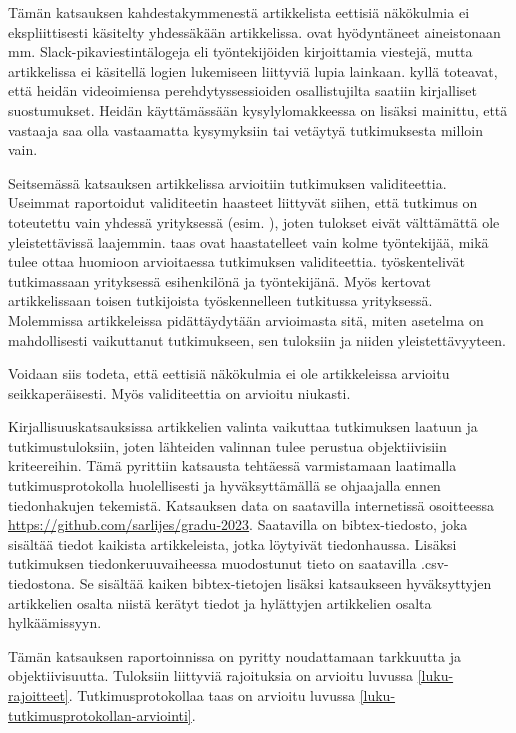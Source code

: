 \documentclass[utf8]{gradu3}
\begin{document}
Tämän katsauksen kahdestakymmenestä artikkelista eettisiä näkökulmia ei ekspliittisesti käsitelty yhdessäkään artikkelissa. \textcite{moe-ym-2020} ovat hyödyntäneet aineistonaan mm. Slack-pikaviestintälogeja eli työntekijöiden kirjoittamia viestejä, mutta artikkelissa ei käsitellä logien lukemiseen liittyviä lupia lainkaan. \textcite{yates-ym-2020} kyllä toteavat, että heidän videoimiensa perehdytyssessioiden osallistujilta saatiin kirjalliset suostumukset. Heidän käyttämässään kysylylomakkeessa on lisäksi mainittu, että vastaaja saa olla vastaamatta kysymyksiin tai vetäytyä tutkimuksesta milloin vain. 

Seitsemässä katsauksen artikkelissa arvioitiin tutkimuksen validiteettia. Useimmat raportoidut validiteetin haasteet liittyvät siihen, että tutkimus on toteutettu vain yhdessä yrityksessä (esim. \textcite{johnson-senges-2010}), joten tulokset eivät välttämättä ole yleistettävissä laajemmin. \textcite{viana-ym-2014} taas ovat haastatelleet vain kolme työntekijää, mikä tulee ottaa huomioon arvioitaessa tutkimuksen validiteettia. \textcite{hemphill-begel-2011} työskentelivät tutkimassaan yrityksessä esihenkilönä ja työntekijänä. Myös \textcite{kumar-wallace-2019} kertovat artikkelissaan toisen tutkijoista työskennelleen tutkitussa yrityksessä. Molemmissa artikkeleissa pidättäydytään arvioimasta sitä, miten asetelma on mahdollisesti vaikuttanut tutkimukseen, sen tuloksiin ja niiden yleistettävyyteen.

Voidaan siis todeta, että eettisiä näkökulmia ei ole artikkeleissa arvioitu seikkaperäisesti. Myös validiteettia on arvioitu niukasti.

Kirjallisuuskatsauksissa artikkelien valinta vaikuttaa tutkimuksen laatuun ja tutkimustuloksiin, joten lähteiden valinnan tulee perustua objektiivisiin kriteereihin. Tämä pyrittiin katsausta tehtäessä varmistamaan laatimalla tutkimusprotokolla huolellisesti ja hyväksyttämällä se ohjaajalla ennen tiedonhakujen tekemistä. Katsauksen data on saatavilla internetissä osoitteessa 
 \href{https://github.com/sarlijes/gradu-2023}{https://github.com/sarlijes/gradu-2023}. Saatavilla on bibtex-tiedosto, joka sisältää tiedot kaikista artikkeleista, jotka löytyivät tiedonhaussa. Lisäksi tutkimuksen tiedonkeruuvaiheessa muodostunut tieto on saatavilla .csv-tiedostona. Se sisältää kaiken bibtex-tietojen lisäksi katsaukseen hyväksyttyjen artikkelien osalta niistä kerätyt tiedot ja hylättyjen artikkelien osalta hylkäämissyyn. 

Tämän katsauksen raportoinnissa on pyritty noudattamaan tarkkuutta ja objektiivisuutta. Tuloksiin liittyviä rajoituksia on arvioitu luvussa \ref{luku-rajoitteet}. Tutkimusprotokollaa taas on arvioitu luvussa \ref{luku-tutkimusprotokollan-arviointi}.


\printbibliography
\end{document}
